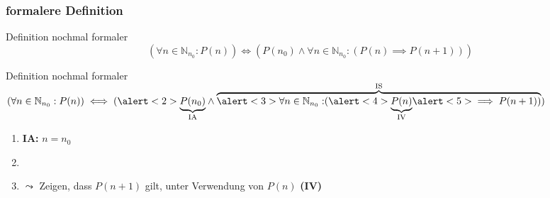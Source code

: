 


\subsubsection{formalere Definition}
\begin{frame}{Definition nochmal formaler}
    \begin{equation*}
        (\forall n \in \mathbb{N}_{n_0}: P(n)) \iff (P(n_0) \wedge \forall n \in \mathbb{N}_{n_0}: (P(n) \implies P(n+1)))
    \end{equation*}    
\end{frame}

\begin{frame}{Definition nochmal formaler}
    $(\forall n \in \mathbb{N}_{n_0}: P(n)) \iff (\alert<2>{\underbrace{P(n_0)}_{\text{IA}}}\wedge \overbrace{\alert<3>{\forall n \in \mathbb{N}_{n_0}:} (\alert<4>{\underbrace{P(n)}_{\text{IV}}} \alert<5>{\implies P(n+1)})}^{\text{IS}})$
    \begin{enumerate}
        \item<2->\alert<2>{\textbf{IA:} $n = n_0$}
        \item<3->
        \item<5->\alert{$\leadsto$ Zeigen, dass $P(n+1)$ gilt, unter Verwendung von $P(n)$ \tiny{\textbf{(IV)}}}
    \end{enumerate}
\end{frame}


